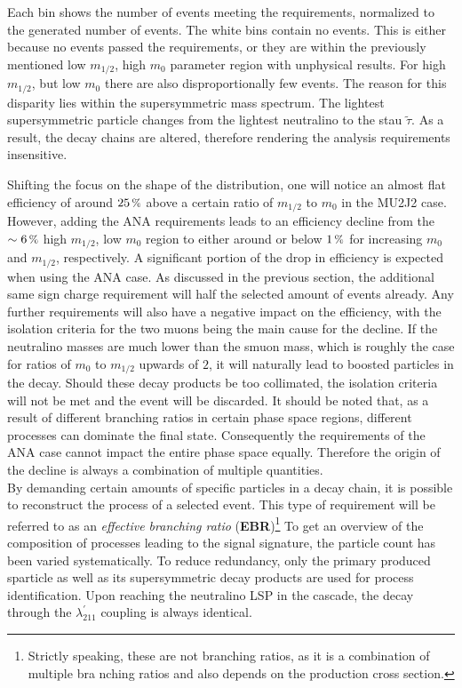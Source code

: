 \noindent Each bin shows the number of events meeting the requirements, normalized to the generated number of events. The white bins contain no events. This is either because no events passed the requirements, or they are within the previously mentioned low $m_{1/2}$, high $m_0$ parameter region with unphysical results. For high $m_{1/2}$, but low $m_0$ there are also disproportionally few events. The reason for this disparity lies within the supersymmetric mass spectrum. The lightest supersymmetric particle changes from the lightest neutralino to the stau $\tilde{\tau}$. As a result, the decay chains are altered, therefore rendering the analysis requirements insensitive. 

Shifting the focus on the shape of the distribution, one will notice an almost flat efficiency of around $25\,\pct$ above a certain ratio of $m_{1/2}$ to $m_0$ in the MU2J2 case. However, adding the ANA requirements leads to an efficiency decline from the $\sim 6\,\pct$ high $m_{1/2}$, low $m_0$ region to either around or below $1\,\pct$ for increasing $m_0$ and $m_{1/2}$, respectively. A significant portion of the drop in efficiency is expected when using the ANA case. As discussed in the previous section, the additional same sign charge requirement will half the selected amount of events already. Any further requirements will also have a negative impact on the efficiency, with the isolation criteria for the two muons being the main cause for the decline. If the neutralino masses are much lower than the smuon mass, which is roughly the case for ratios of $m_0$ to $m_{1/2}$ upwards of $2$, it will naturally lead to boosted particles in the decay. Should these decay products be too collimated, the isolation criteria will not be met and the event will be discarded. It should be noted that, as a result of different branching ratios in certain phase space regions, different processes can dominate the final state. Consequently the requirements of the ANA case cannot impact the entire phase space equally. Therefore the origin of the decline is always a combination of multiple quantities. \\

By demanding certain amounts of specific particles in a decay chain, it is possible to reconstruct the process of a selected event. This type of requirement will be referred to as an \textit{effective branching ratio} (\textbf{EBR})\footnote{Strictly speaking, these are not branching ratios, as it is a combination of multiple bra
nching ratios and also depends on the production cross section.} To get an overview of the composition of processes leading to the signal signature, the particle count has been varied systematically. To reduce redundancy, only the primary produced sparticle as well as its supersymmetric decay products are used for process identification. Upon reaching the neutralino LSP in the cascade, the decay through the $\lambda^\prime_{211}$ coupling is always identical.

